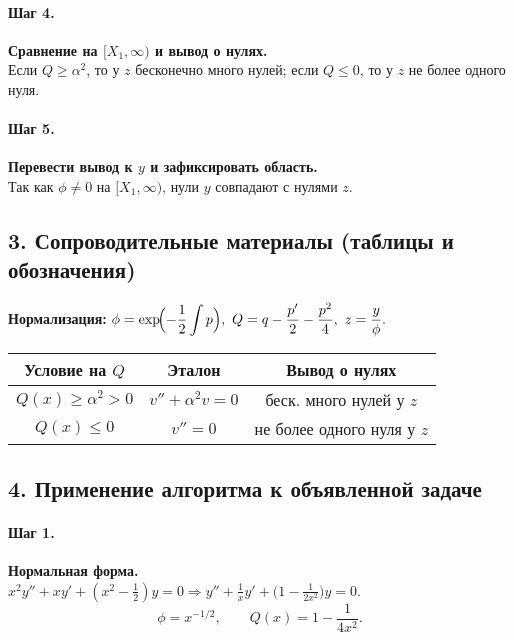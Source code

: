 \paragraph{Шаг 4.} \textbf{Сравнение на \([X_1,\infty)\) и вывод о нулях.}\\
Если \(Q\ge \alpha^{2}\), то у \(z\) бесконечно много нулей; если \(Q\le 0\), то у \(z\) не более одного нуля.

\paragraph{Шаг 5.} \textbf{Перевести вывод к \(y\) и зафиксировать область.}\\
Так как \(\phi\neq 0\) на \([X_1,\infty)\), нули \(y\) совпадают с нулями \(z\).

\subsection*{3. Сопроводительные материалы (таблицы и обозначения)}

\textbf{Нормализация:}\quad
\(\displaystyle \phi=\exp\!\Bigl(-\frac12\int p\Bigr),\ 
Q=q-\frac{p'}{2}-\frac{p^{2}}{4},\ 
z=\dfrac{y}{\phi}.\)

\begin{center}
\begin{tabular}{|c|c|c|}
\hline
\textbf{Условие на } \(Q\) & \textbf{Эталон} & \textbf{Вывод о нулях} \\
\hline
\(Q(x)\ge \alpha^{2}>0\) & \(v''+\alpha^{2}v=0\) & беск. много нулей у \(z\) \\
\hline
\(Q(x)\le 0\) & \(v''=0\) & не более одного нуля у \(z\) \\
\hline
\end{tabular}
\end{center}

\subsection*{4. Применение алгоритма к объявленной задаче}

\paragraph{Шаг 1.} \textbf{Нормальная форма.}\\
\(x^{2}y''+xy'+(x^{2}-\tfrac12)y=0 \Rightarrow
y''+\tfrac{1}{x}y'+\bigl(1-\tfrac{1}{2x^{2}}\bigr)y=0\).
\[
\phi=x^{-1/2},\qquad
Q(x)=1-\frac{1}{4x^{2}}.
\]

